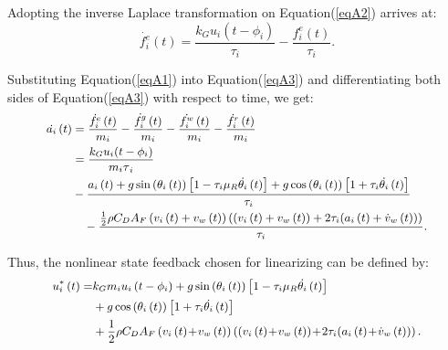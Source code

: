 \documentclass[a4paper]{cas-sc}
\begin{document}
Adopting the inverse Laplace transformation on Equation(\ref{eqA2}) arrives at:
\begin{equation}
  \dot{f_i^e}\left(t\right)=\frac{k_Gu_i(t-\phi_i)}{\tau_i}-\frac{f_i^e\left(t\right)}{\tau_i}.
  \label{eqA3}
\end{equation}

Substituting Equation(\ref{eqA1}) into Equation(\ref{eqA3}) and differentiating both sides of Equation(\ref{eqA3}) with respect to time, we get:
\begin{equation}
  \begin{small}
    \begin{aligned}
      \dot{a_i}\left(t\right) & =\frac{\dot{f_i^e}\left(t\right)}{m_i}-\frac{\dot{f_i^g}\left(t\right)}{m_i}-\frac{\dot{f_i^w}\left(t\right)}{m_i}-\frac{\dot{f_i^r}\left(t\right)}{m_i}                                                        \\
                              & =\frac{k_Gu_i(t-\phi_i)}{{m_i\tau}_i}                                                                                                                                                                           \\&-\frac{a_i\left(t\right)+g\sin{\left(\theta_i\left(t\right)\right)}\left[1-\tau_i\mu_R\dot{\theta_i}\left(t\right)\right]+g\cos{\left(\theta_i\left(t\right)\right)}\left[1+\tau_i\dot{\theta_i}\left(t\right)\right]}{\tau_i} \\
                              & \quad -\frac{\frac{1}{2}\rho C_DA_F\left(v_i\left(t\right)+v_w\left(t\right)\right)\left(\left(v_i\left(t\right)+v_w\left(t\right)\right)+2\tau_i(a_i\left(t\right)+\dot{v}_{w}\left(t\right))\right)}{\tau_i}.
    \end{aligned}
    \label{eqA4}
  \end{small}
\end{equation}

Thus, the nonlinear state feedback chosen for linearizing can be defined by:
\begin{equation}
  \begin{small}
    \begin{aligned}
      u_i^\ast\left(t\right)  = & k_Gm_iu_i\left(t-\phi_i\right)+g\sin{\left(\theta_i\left(t\right)\right)}\left[1-\tau_i\mu_R\dot{\theta_i}\left(t\right)\right]                                                                            \\ & +g\cos{\left(\theta_i\left(t\right)\right)}\left[1+\tau_i\dot{\theta_i}\left(t\right)\right] \\
                                & +\frac{1}{2}\rho C_DA_F\left(v_i\left(t\right)\!+\!v_w\left(t\right)\right)\left(\left(v_i\left(t\right)\!+\!v_w\left(t\right)\right)\!+\!2\tau_i(a_i\left(t\right)\!+\!\dot{v}_{w}\left(t\right))\right).
    \end{aligned}
  \end{small}
  \label{eqA5}
\end{equation}
\end{document}
